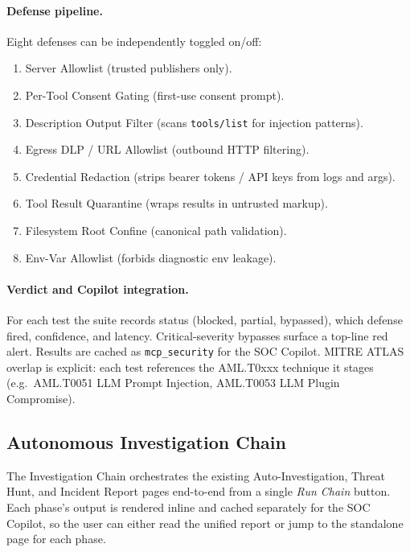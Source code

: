 \documentclass[11pt,a4paper]{article}
\begin{document}
\paragraph{Defense pipeline.}  Eight defenses can be independently
toggled on/off:
\begin{enumerate}[nosep]
  \item Server Allowlist (trusted publishers only).
  \item Per-Tool Consent Gating (first-use consent prompt).
  \item Description Output Filter (scans \texttt{tools/list} for
        injection patterns).
  \item Egress DLP / URL Allowlist (outbound HTTP filtering).
  \item Credential Redaction (strips bearer tokens / API keys from
        logs and args).
  \item Tool Result Quarantine (wraps results in untrusted markup).
  \item Filesystem Root Confine (canonical path validation).
  \item Env-Var Allowlist (forbids diagnostic env leakage).
\end{enumerate}

\paragraph{Verdict and Copilot integration.} For each test the suite
records status (blocked, partial, bypassed), which defense fired,
confidence, and latency.  Critical-severity bypasses surface a top-line
red alert.  Results are cached as \texttt{mcp\_security} for the
SOC Copilot.  MITRE ATLAS overlap is explicit: each test references
the AML.T0xxx technique it stages (e.g.\ AML.T0051 LLM Prompt
Injection, AML.T0053 LLM Plugin Compromise).

\subsection{Autonomous Investigation Chain}
\label{sec:investigation_chain}

The Investigation Chain orchestrates the existing Auto-Investigation,
Threat Hunt, and Incident Report pages end-to-end from a single
\emph{Run Chain} button.  Each phase's output is rendered inline
and cached separately for the SOC Copilot, so the user can either
read the unified report or jump to the standalone page for each
phase.
\end{document}
